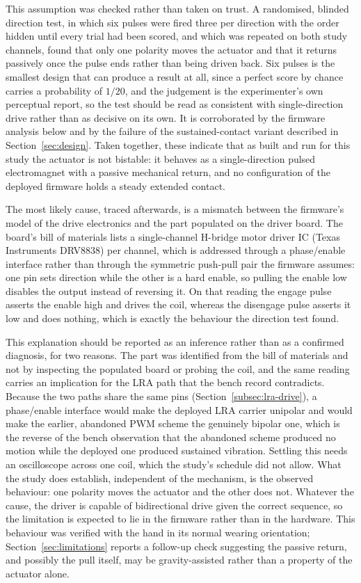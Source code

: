 \documentclass[12pt, a4paper, twoside, openright]{report}
\begin{document}
This assumption was checked rather than taken on trust. A randomised, blinded
direction test, in which six pulses were fired three per direction with the
order hidden until every trial had been scored, and which was repeated on both
study channels, found that only one polarity moves the actuator and that it
returns passively once the pulse ends rather than being driven back. Six pulses
is the smallest design that can produce a result at all, since a perfect score
by chance carries a probability of $1/20$, and the judgement is the
experimenter's own perceptual report, so the test should be read as consistent
with single-direction drive rather than as decisive on its own. It is
corroborated by the firmware analysis below and by the failure of the
sustained-contact variant described in Section~\ref{sec:design}. Taken
together, these indicate that as built and run for this study the actuator is
not bistable: it behaves as a single-direction pulsed electromagnet with a
passive mechanical return, and no configuration of the deployed firmware holds
a steady extended contact.

The most likely cause, traced afterwards, is a mismatch between the firmware's
model of the drive electronics and the part populated on the driver board. The
board's bill of materials lists a single-channel H-bridge motor driver IC
(Texas Instruments DRV8838) per channel, which is addressed through a
phase/enable interface rather than through the symmetric push-pull pair the
firmware assumes: one pin sets direction while the other is a hard enable, so
pulling the enable low disables the output instead of reversing it. On that
reading the engage pulse asserts the enable high and drives the coil, whereas
the disengage pulse asserts it low and does nothing, which is exactly the
behaviour the direction test found.

This explanation should be reported as an inference rather than as a confirmed
diagnosis, for two reasons. The part was identified from the bill of materials
and not by inspecting the populated board or probing the coil, and the same
reading carries an implication for the LRA path that the bench record
contradicts. Because the two paths share the same pins
(Section~\ref{subsec:lra-drive}), a phase/enable interface would make the
deployed LRA carrier unipolar and would make the earlier, abandoned PWM scheme
the genuinely bipolar one, which is the reverse of the bench observation that
the abandoned scheme produced no motion while the deployed one produced
sustained vibration. Settling this needs an oscilloscope across one coil, which
the study's schedule did not allow. What the study does establish, independent
of the mechanism, is the observed behaviour: one polarity moves the actuator
and the other does not. Whatever the cause, the driver is capable of
bidirectional drive given the correct sequence, so the limitation is expected
to lie in the firmware rather than in the hardware. This behaviour was verified
with the hand in its normal wearing orientation;
Section~\ref{sec:limitations} reports a follow-up check suggesting the passive
return, and possibly the pull itself, may be gravity-assisted rather than a
property of the actuator alone.
\end{document}
